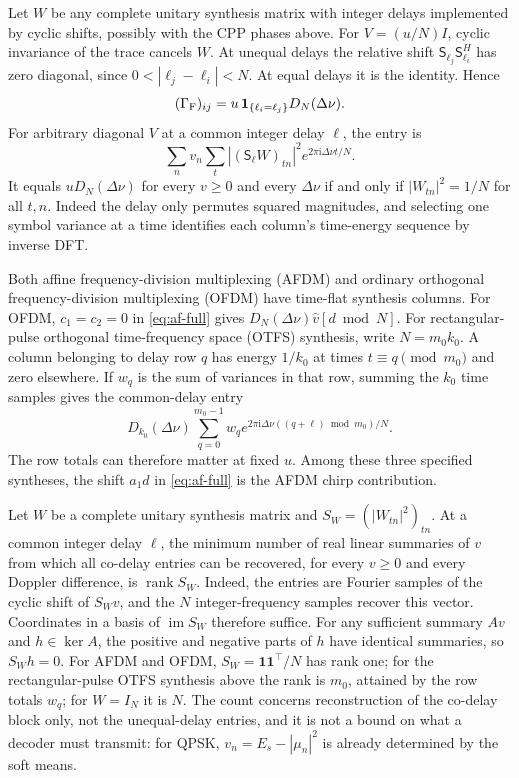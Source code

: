 \begin{afdmremark}
Let $W$ be any complete unitary synthesis matrix with integer delays
implemented by cyclic shifts, possibly with the CPP phases above. For
$V=(u/N)I$, cyclic invariance of the trace cancels $W$. At unequal
delays the relative shift
$\mathsf S_{\ell_j}\mathsf S_{\ell_i}^H$ has zero diagonal, since
$0<|\ell_j-\ell_i|<N$. At equal delays it is the identity. Hence
\[
 (\Gamma_{\rm F})_{ij}
 =u\,\mathbf1_{\{\ell_i=\ell_j\}} D_N(\Delta\nu).
\]
For arbitrary diagonal $V$ at a common integer delay $\ell$, the entry is
\[
 \sum_n v_n\sum_t |(\mathsf S_\ell W)_{tn}|^2
                         e^{2\pi\mathrm{i}\Delta\nu t/N}.
\]
It equals $uD_N(\Delta\nu)$ for every $v\ge0$ and every $\Delta\nu$
if and only if $|W_{tn}|^2=1/N$ for all $t,n$. Indeed the delay only
permutes squared magnitudes, and selecting one symbol variance at a
time identifies each column's time-energy sequence by inverse DFT.

Both affine frequency-division multiplexing (AFDM) and ordinary
orthogonal frequency-division multiplexing (OFDM) have time-flat
synthesis columns. For OFDM, $c_1=c_2=0$ in \eqref{eq:af-full} gives
$D_N(\Delta\nu)\widehat v[d\bmod N]$. For rectangular-pulse orthogonal
time-frequency space (OTFS) synthesis, write $N=m_0k_0$. A column
belonging to delay row $q$ has energy $1/k_0$ at times
$t\equiv q\pmod{m_0}$ and zero elsewhere. If $w_q$ is the sum of
variances in that row, summing the $k_0$ time samples gives the
common-delay entry
\[
 D_{k_0}(\Delta\nu)\sum_{q=0}^{m_0-1}
       w_q e^{2\pi\mathrm{i}\Delta\nu((q+\ell)\bmod m_0)/N}.
\]
The row totals can therefore matter at fixed $u$. Among these three
specified syntheses, the shift $a_1d$ in \eqref{eq:af-full} is the
AFDM chirp contribution.
\end{afdmremark}

\begin{afdmremark}
Let $W$ be a complete unitary synthesis matrix and $S_W=(|W_{tn}|^2)_{tn}$.
At a common integer delay $\ell$, the minimum number of real linear
summaries of $v$ from which all co-delay entries can be recovered,
for every $v\ge0$ and every Doppler difference, is $\operatorname{rank}S_W$.
Indeed, the entries are Fourier samples of the cyclic shift of $S_Wv$,
and the $N$ integer-frequency samples recover this vector.
Coordinates in a basis of $\operatorname{im}S_W$ therefore suffice.
For any sufficient summary $Av$ and $h\in\ker A$, the positive and
negative parts of $h$ have identical summaries, so $S_Wh=0$.
For AFDM and OFDM, $S_W=\mathbf1\mathbf1^{\top}/N$ has rank one; for the
rectangular-pulse OTFS synthesis above the rank is $m_0$, attained by the
row totals $w_q$; for $W=I_N$ it is $N$. The count concerns reconstruction
of the co-delay block only, not the unequal-delay entries, and it is not a
bound on what a decoder must transmit: for QPSK, $v_n=E_s-|\mu_n|^2$ is
already determined by the soft means.
\end{afdmremark}


